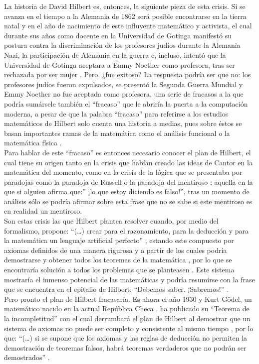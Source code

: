 \documentclass[a4paper,11pt]{article}
\begin{document}
La historia de David Hilbert es, entonces, la siguiente pieza de esta crisis. Si se avanza en el tiempo a la Alemania de 1862 \cite{barral_2017} será posible encontrarse en la tierra natal y en el año de nacimiento de este influyente matemático y activista, el cual durante sus años como docente en la Universidad de Gotinga manifestó su postura contra la discriminación de los profesores judíos durante la Alemania Nazi, la participación de Alemania en la guerra e, incluso, intentó que la Universidad de Gotinga aceptara a Emmy Noether como profesora, tras ser rechazada por ser mujer \cite{barral_2017}. Pero, ¿fue exitoso? La respuesta podría ser que no: los profesores judíos fueron expulsados, se presentó la Segunda Guerra Mundial y Emmy Noether no fue aceptada como profesora, una serie de fracasos a la que podría sumársele también el “fracaso” que le abriría la puerta a la computación moderna, a pesar de que la palabra “fracaso” para referirse a los estudios matemáticos de Hilbert solo cuenta una historia a medias, pues sobre éstos se basan importantes ramas de la matemática como el análisis funcional o la matemática física \cite{barral_2017}.\\
Para hablar de este “fracaso” es entonces necesario conocer el plan de Hilbert, el cual tiene su origen tanto en la crisis que habían creado las ideas de Cantor en la matemática del momento, como en la crisis de la lógica que se presentaba por paradojas como la paradoja de Russell o la paradoja del mentiroso \cite{chaitin2003ordenadores}; aquella en la que si alguien afirma que:” ¡lo que estoy diciendo es falso!”, tras un momento de análisis sólo se podría afirmar sobre esta frase que no se sabe si este mentiroso es en realidad un mentiroso. \\
Son estas crisis las que Hilbert plantea resolver cuando, por medio del formalismo, propone: “(…) crear para el razonamiento, para la deducción y para la matemática un lenguaje artificial perfecto” \cite[p.3]{chaitin2003ordenadores}, estando este compuesto por axiomas definidos de una manera rigurosa y a partir de los cuales podría demostrarse y obtener todos los teoremas de la matemática \cite{chaitin2003ordenadores}, por lo que se encontraría solución a todos los problemas que se planteasen \cite{barral_2017}. Este sistema mostraría el inmenso potencial de las matemáticas y podría resumirse con la frase que se encuentra en el epitafio de Hilbert: “Debemos saber. ¡Sabremos!” \cite{bombal_2018}. \\
Pero pronto el plan de Hilbert fracasaría. Es ahora el año 1930 y Kurt Gödel, un matemático nacido en la actual República Checa \cite{rago_2016}, ha publicado su “Teorema de la incompletitud” con el cual derrumbará el plan de Hilbert al demostrar que un sistema de axiomas no puede ser completo y consistente al mismo tiempo \cite{rago_2016}, por lo que: “(…) si se supone que los axiomas y las reglas de deducción no permiten la demostración de teoremas falsos, habrá teoremas verdaderos que no podrán ser demostrados” \cite[p.4]{chaitin2003ordenadores}. \\
\end{document}
